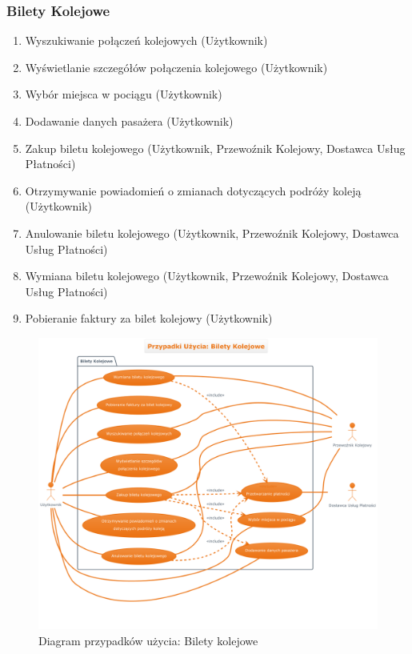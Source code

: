 \documentclass[a4paper,12pt]{article}
\begin{document}
\subsubsection{Bilety Kolejowe}
\begin{enumerate}[label=\arabic*.]
    \item Wyszukiwanie połączeń kolejowych (Użytkownik)
    \item Wyświetlanie szczegółów połączenia kolejowego (Użytkownik)
    \item Wybór miejsca w pociągu (Użytkownik)
    \item Dodawanie danych pasażera (Użytkownik)
    \item Zakup biletu kolejowego (Użytkownik, Przewoźnik Kolejowy, Dostawca Usług Płatności)
    \item Otrzymywanie powiadomień o zmianach dotyczących podróży koleją (Użytkownik)
    \item Anulowanie biletu kolejowego (Użytkownik, Przewoźnik Kolejowy, Dostawca Usług Płatności)
    \item Wymiana biletu kolejowego (Użytkownik, Przewoźnik Kolejowy, Dostawca Usług Płatności)
    \item Pobieranie faktury za bilet kolejowy (Użytkownik)
\end{enumerate}
\begin{figure}[H]
    \centering
    \includegraphics[width=0.8\linewidth]{diagramy/przypadki_uzycia/images/diagram_bilety_kolejowe_1.png}
    \caption{Diagram przypadków użycia: Bilety kolejowe}
    \label{fig:diag_bk_1}
\end{figure}
\end{document}
